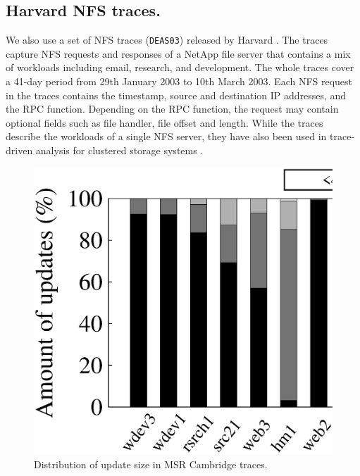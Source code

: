 
\subsection{Harvard NFS traces.}  We also use a set of NFS traces
(\texttt{DEAS03}) released by Harvard \cite{ellard04}.  The traces capture NFS
requests and responses of a NetApp file server 
that contains a mix of workloads including email, research, and development.
The whole traces cover a 41-day period from 29th January 2003 to 10th March
2003.  Each NFS request in the traces contains the timestamp, source and
destination IP addresses, and the RPC function. 
Depending on the RPC function, the request may contain optional fields such as
file handler, file offset and length.  While the traces describe the
workloads of a single NFS server, they have also been used in trace-driven
analysis for clustered storage systems \cite{abd05,hendricks06}.


\begin{figure}[t]
    \centering
    \includegraphics[width=\linewidth]{charts/msr_dist/eps/msr_dist}
    \caption{Distribution of update size in MSR Cambridge traces.}
    \label{fig:msr_dist}
\end{figure}

